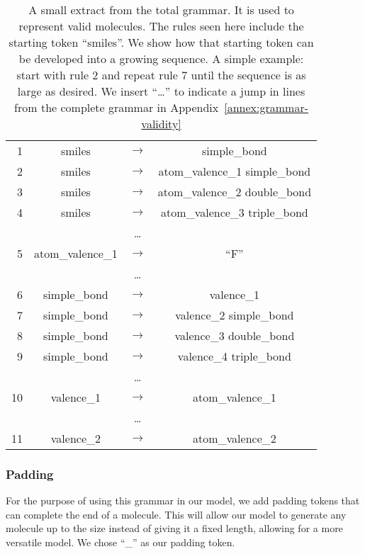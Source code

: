 \documentclass[../Document.tex]{subfiles}
\begin{document}
\begin{table}[t]
    \centering
    \begin{tabular}{r|ccc}
        1 & smiles & $\rightarrow$ & simple\_bond \\
        2 & smiles & $\rightarrow$ & atom\_valence\_1 simple\_bond \\
        3 & smiles & $\rightarrow$ & atom\_valence\_2 double\_bond \\
        4 & smiles & $\rightarrow$ & atom\_valence\_3 triple\_bond \\
         & & \ldots & \\
        5 & atom\_valence\_1 & $\rightarrow$ & ``F'' \\
         & & \ldots & \\
        6 & simple\_bond & $\rightarrow$ & valence\_1 \\
        7 & simple\_bond & $\rightarrow$ & valence\_2 simple\_bond \\
        8 & simple\_bond & $\rightarrow$ & valence\_3 double\_bond \\
        9 & simple\_bond & $\rightarrow$ & valence\_4 triple\_bond \\
         & & \ldots & \\
        10 & valence\_1 & $\rightarrow$ & atom\_valence\_1 \\
         & & \ldots & \\
        11 & valence\_2 & $\rightarrow$ & atom\_valence\_2 \\
    \end{tabular}
    \caption[A small extract from the total grammar.]{A small extract from the total grammar. It is used to represent valid molecules. The rules seen here include the starting token ``smiles''. We show how that starting token can be developed into a growing sequence. A simple example: start with rule 2 and repeat rule 7 until the sequence is as large as desired. We insert ``\ldots'' to indicate a jump in lines from the complete grammar in Appendix~\ref{annex:grammar-validity}}
    \label{tab:validity-grammar-example}
\end{table}

\subsubsection{Padding}
For the purpose of using this grammar in our \cp model, we add padding tokens that can complete the end of a molecule. 
This will allow our model to generate any molecule up to the size instead of giving it a fixed length, allowing for a more versatile model.
We chose ``\_'' as our padding token.
\end{document}
